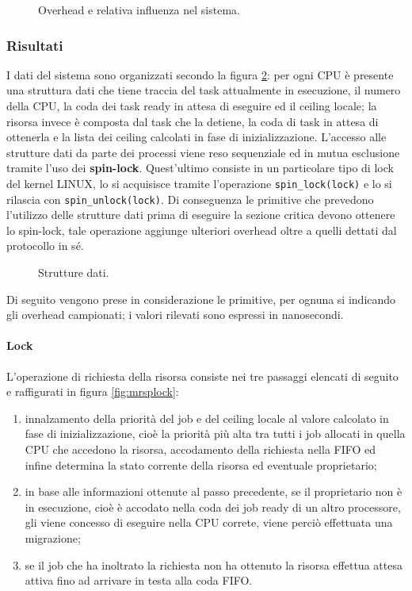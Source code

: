 \begin{figure}
\centering
{}
\caption{Overhead e relativa influenza nel sistema.}
\label{fig:overheads_suffered}
\end{figure}

\subsubsection{Risultati}
\label{sec:overhead_ris}

\noindent I dati del sistema sono organizzati secondo la figura \ref{fig:datas}: per ogni CPU è presente una struttura dati che tiene traccia del task attualmente in esecuzione, il numero della CPU, la coda dei task ready in attesa di eseguire ed il ceiling locale; la risorsa invece è composta dal task che la detiene, la coda di task in attesa di ottenerla e la lista dei ceiling calcolati in fase di inizializzazione. L'accesso alle strutture dati da parte dei processi viene reso sequenziale ed in mutua esclusione tramite l'uso dei \textbf{spin-lock}. Quest'ultimo consiste in un particolare tipo di lock del kernel LINUX, lo si acquisisce tramite l'operazione \texttt{spin\_lock(lock)} e lo si rilascia con \texttt{spin\_unlock(lock)}. Di conseguenza le primitive che prevedono l'utilizzo delle strutture dati prima di eseguire la sezione critica devono ottenere lo spin-lock, tale operazione aggiunge ulteriori overhead oltre a quelli dettati dal protocollo in sé.\\

\begin{figure}
\centering
{}
\caption{Strutture dati.}
\label{fig:datas}
\end{figure}


\noindent Di seguito vengono prese in considerazione le primitive, per ognuna si indicando gli overhead campionati; i valori rilevati sono espressi in nanosecondi.

\paragraph{Lock}  L'operazione di richiesta della risorsa consiste nei tre passaggi elencati di seguito e raffigurati in figura \ref{fig:mrsplock}:

\begin{enumerate}
	\item innalzamento della priorità del job e del ceiling locale al valore calcolato in fase di inizializzazione, cioè la priorità più alta tra tutti i job allocati in quella CPU che accedono la risorsa, accodamento della richiesta nella FIFO ed infine determina la stato corrente della risorsa ed eventuale proprietario;
	\item in base alle informazioni ottenute al passo precedente, se il proprietario non è in esecuzione, cioè è accodato nella coda dei job ready di un altro processore, gli viene concesso di eseguire nella CPU correte, viene perciò effettuata una migrazione;
	\item se il job che ha inoltrato la richiesta non ha ottenuto la risorsa effettua attesa attiva fino ad arrivare in testa alla coda FIFO.
\end{enumerate}

